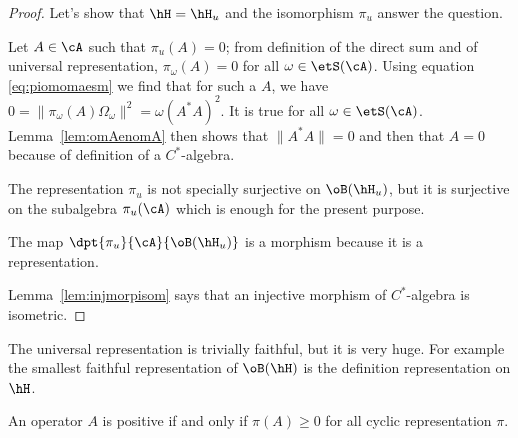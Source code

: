 \begin{proof}
Let's show that $\hH=\hH_u$ and the isomorphism $\pi_u$ answer the question.

Let $A\in\cA$ such that $\pi_u(A)=0$; from definition of the direct sum and of universal representation,  $\pi_{\omega}(A)=0$ for all $\omega\in\etS(\cA)$. Using equation \eqref{eq:piomomaesm} we find that for such a $A$, we have $0=\| \pi_{\omega}(A)\Omega_{\omega} \|^2=\omega(A^*A)^2$. It is true for all $\omega\in\etS(\cA)$. Lemma~\ref{lem:omAenomA} then shows that $\| A^*A \|=0$ and then that $A=0$ because of definition of a $C^*$-algebra.

The representation $\pi_u$ is not specially surjective on $\oB(\hH_u)$, but it is surjective on the subalgebra $\pi_u(\cA)$ which is enough for the present purpose.

The map $\dpt{\pi_u}{\cA}{\oB(\hH_u)}$ is a morphism because it is a representation.


Lemma~\ref{lem:injmorpisom} says that an injective morphism of $C^*$-algebra is isometric.

\end{proof}

The universal representation is trivially faithful, but it is very huge. For example the smallest faithful representation of $\oB(\hH)$ is the definition representation on $\hH$.

\begin{corollary}
An operator $A$ is positive if and only if $\pi(A)\geq 0$ for all cyclic representation $\pi$.
\end{corollary}

